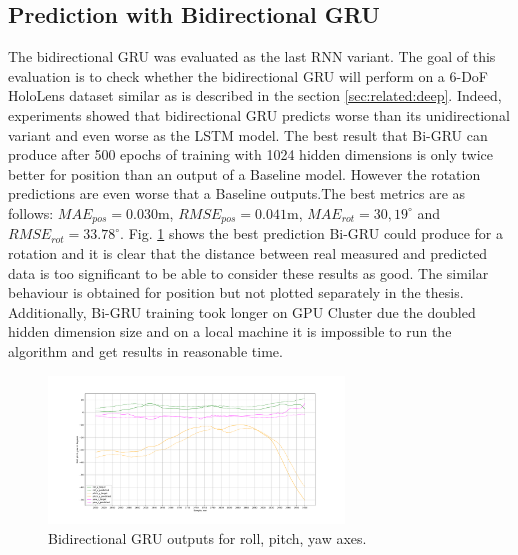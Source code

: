 \subsection{Prediction with Bidirectional GRU}
\label{sec:eval:experiments:bi-gru}
The bidirectional GRU was evaluated as the last RNN variant. The goal of this evaluation is to check whether the bidirectional GRU will perform on a 6-DoF HoloLens dataset similar as is described in the section \ref{sec:related:deep}. Indeed, experiments showed that bidirectional GRU predicts worse than its unidirectional variant and even worse as the LSTM model. The best result that Bi-GRU can produce after 500 epochs of training with 1024 hidden dimensions is only twice better for position than an output of a Baseline model. However the rotation predictions are even worse that a Baseline outputs.The best metrics are as follows: $MAE_{pos} = 0.030$m, $RMSE_{pos} = 0.041$m, $MAE_{rot} = 30,19^{\circ}$ and $RMSE_{rot} =33.78^{\circ}$. Fig. \ref{fig:grubi} shows the best prediction Bi-GRU could produce for a rotation and it is clear that the distance between real measured and predicted data is too significant to be able to consider these results as good. The similar behaviour is obtained for position but not plotted separately in the thesis. Additionally, Bi-GRU training took longer on GPU Cluster due the doubled hidden dimension size and on a local machine it is impossible to run the algorithm and get results in reasonable time. 
\begin{figure}[h!]
	\begin{center}
		\includegraphics[width=0.7\textwidth, keepaspectratio]{gfx/gru-bi1-roll_pitch_yaw.pdf}
		\caption{Bidirectional GRU outputs for roll, pitch, yaw axes.}
		\label{fig:grubi}
	\end{center}
\end{figure}